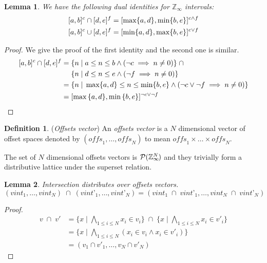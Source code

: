 \documentclass{article}
\theoremstyle{definition}
\newtheorem{defn}{Definition}
\theoremstyle{plain}
\newtheorem{lem}{Lemma}
\theoremstyle{remark}
\newcommand{\zinf}{\textnormal{$\mathbb{Z}_\infty$}}
\newcommand{\interv}[3]{\textnormal{$\lbrack#1,#2\rbrack^{#3}$}}
\begin{document}
\begin{lem}{}\label{lem:zinf-identities}
  We have the following dual identities for \zinf{} intervals:
%
  \begin{align*}
    \interv{a}{b}{c} \cap \interv{d}{e}{f} & =
      \interv{\max \{a,d\}}{\min \{b,e\}}{c \wedge f} \\
    \interv{a}{b}{c} \cup \interv{d}{e}{f} & =
      \interv{\min \{a,d\}}{\max \{b,e\}}{c \vee f}
  \end{align*}
\end{lem}
%
\begin{proof}
  We give the proof of the first identity and the second one is similar.
  \begin{align*}
    \interv{a}{b}{c} \cap \interv{d}{e}{f} = &
      \; \{ n \;|\; a \leq n \leq b \wedge (\neg c \implies n \neq 0) \}
      \;\cap \\
      & \; \{ n \;|\; d \leq n \leq e \wedge (\neg f \implies n \neq 0) \}
      \\
    = & \; \{ n \;|\; \max \{a,d\} \leq n \leq \min \{b,e\} \wedge (\neg c
      \vee \neg f \implies n \neq 0) \} \\
    = & \; \interv{\max{\{a,d\}}}{\min{\{b,e\}}}{\neg c \vee \neg f}
  \end{align*}
\end{proof}

\begin{defn}{(\emph{Offsets vector})}
  An \emph{offsets vector} is a $N$ dimensional vector of offset spaces denoted
  by $(\textit{offs}_1, \dots, \textit{offs}_N)$ to mean $\textit{offs}_1 \times
  \dots \times \textit{offs}_N$.

  The set of $N$ dimensional offsets vectors is
  $\mathcal{P}{(\zinf{}^{\mkern-19mu{N}})}$ and they trivially form a
  distributive lattice under the superset relation.
\end{defn}

\begin{lem}{}\label{lem:vector-intersect}
  Intersection distributes over offsets vectors.
%
  \begin{equation*}
    (\textit{vint}_1, \dots, \textit{vint}_N) \;\cap\;
      (\textit{vint'}_1, \dots, \textit{vint'}_N)
      =
    (\textit{vint}_1 \;\cap\; \textit{vint'}_1, \dots,
     \textit{vint}_N \;\cap\; \textit{vint'}_N)
  \end{equation*}
\end{lem}
%
\begin{proof}
  \begin{align*}
    v \; \cap \; v' &
    = \{x \mid \bigwedge_{1 \leq i \leq N } x_i \in v_i \}
      \;\cap\;
      \{x \mid \bigwedge_{1 \leq i \leq N } x_i \in v'_i \} \\
    & = \{x \mid \bigwedge_{1 \leq i \leq N } (x_i \in v_i \wedge x_i \in v'_i) \} \\
    & = (v_1 \cap v'_1,\dotsc,v_N \cap v'_N)
  \end{align*}
\end{proof}
\end{document}
